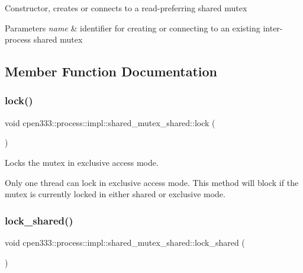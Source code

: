Constructor, creates or connects to a read-\/preferring shared mutex 
\begin{DoxyParams}{Parameters}
{\em name} & identifier for creating or connecting to an existing inter-\/process shared mutex \\
\hline
\end{DoxyParams}


\subsection{Member Function Documentation}
\mbox{\label{classcpen333_1_1process_1_1impl_1_1shared__mutex__shared_a48a55c1a0bc4465ce3042eac361b674c}} 
\subsubsection{\texorpdfstring{lock()}{lock()}}
{\footnotesize\ttfamily void cpen333\+::process\+::impl\+::shared\+\_\+mutex\+\_\+shared\+::lock (\begin{DoxyParamCaption}{ }\end{DoxyParamCaption})\hspace{0.3cm}{\ttfamily [inline]}}



Locks the mutex in exclusive access mode. 

Only one thread can lock in exclusive access mode. This method will block if the mutex is currently locked in either shared or exclusive mode. \mbox{\label{classcpen333_1_1process_1_1impl_1_1shared__mutex__shared_a29036d76ee3f41ae157bb87b4316ea97}} 
\subsubsection{\texorpdfstring{lock\+\_\+shared()}{lock\_shared()}}
{\footnotesize\ttfamily void cpen333\+::process\+::impl\+::shared\+\_\+mutex\+\_\+shared\+::lock\+\_\+shared (\begin{DoxyParamCaption}{ }\end{DoxyParamCaption})\hspace{0.3cm}{\ttfamily [inline]}}



